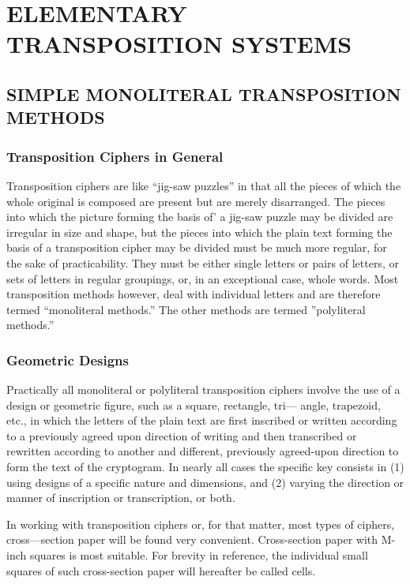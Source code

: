 \chapter{ELEMENTARY TRANSPOSITION SYSTEMS}

 

\section{SIMPLE MONOLITERAL TRANSPOSITION METHODS}

\subsection{Transposition Ciphers in General}

Transposition ciphers are like “jig-saw puzzles” in that all the pieces
of which the whole original is composed are present but are merely disarranged. The pieces into which the picture forming the basis of' a jig-saw puzzle may be divided are irregular in size and shape, but the pieces
into which the plain text forming the basis of a transposition cipher may
be divided must be much more regular, for the sake of practicability.
They must be either single letters or pairs of letters, or sets of letters in
regular groupings, or, in an exceptional case, whole words. Most transposition methods however, deal with individual letters and are therefore
termed “monoliteral methods.” The other methods are termed ”polyliteral
methods.”

\subsection{Geometric Designs}

\mypara Practically all monoliteral or polyliteral transposition ciphers involve
the use of a design or geometric figure, such as a square, rectangle, tri—
angle, trapezoid, etc., in which the letters of the plain text are first
inscribed or written according to a previously agreed upon direction of
writing and then transcribed or rewritten according to another and different, previously agreed-upon direction to form the text of the cryptogram.
In nearly all cases the specific key consists in (1) using designs of a specific nature and dimensions, and (2) varying the direction or manner of
inscription or transcription, or both.

\mypara In working with transposition ciphers or, for that matter, most
types of ciphers, cross—section paper will be found very convenient.
Cross-section paper with M-inch squares is most suitable. For brevity in
reference, the individual small squares of such cross-section paper will
hereafter be called cells.

